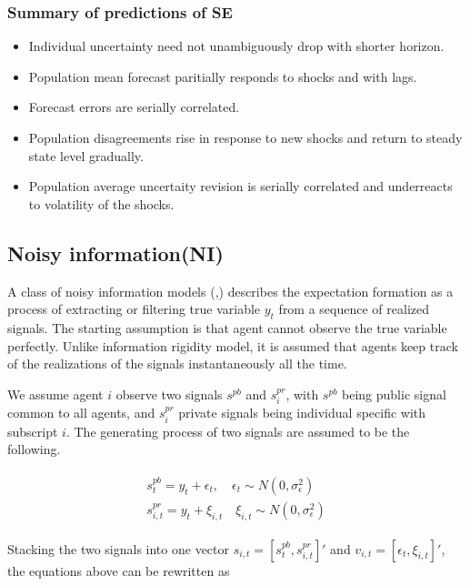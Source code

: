\documentclass[]{article}
\begin{document}
\subsubsection{Summary of predictions of SE}

\begin{itemize}
\item Individual uncertainty need not unambiguously drop with shorter horizon. 
\item Population mean forecast paritially responds to shocks and with lags. 
\item Forecast errors are serially correlated. 
\item Population disagreements rise in response to new shocks and return to steady state level gradually. 
\item Population average uncertaity revision is serially correlated and underreacts to volatility of the shocks.
 
\end{itemize}

\subsection{Noisy information(NI)}

A class of noisy information models (\cite{},\cite{}) describes the expectation formation as a process of extracting or filtering true variable $y_t$ from a sequence of realized signals. The starting assumption is that agent cannot observe the true variable perfectly. Unlike information rigidity model, it is assumed that agents keep track of the realizations of the signals instantaneously all the time. 

We assume agent $i$ observe two signals $s^{pb}$ and $s^{pr}_i$, with $s^{pb}$ being public signal common to all agents, and $s^{pr}_i$ private signals being individual specific with subscript $i$. The generating process of two signals are assumed to be the following.

\begin{eqnarray}
\begin{aligned}
s^{pb}_t = y_t + \epsilon_t, \quad \epsilon_t \sim N(0,\sigma^2_\epsilon)\\ 
s^{pr}_{i,t} = y_t + \xi_{i,t} \quad \xi_{i,t} \sim N(0,\sigma^2_\epsilon)
\end{aligned}
\end{eqnarray}

Stacking the two signals into one vector $s_{i,t} = [s^{pb}_t,s^{pr}_{i,t}]'$ and $v_{i,t}= [\epsilon_t,\xi_{i,t}]'$, the equations above can be rewritten as 
\end{document}
